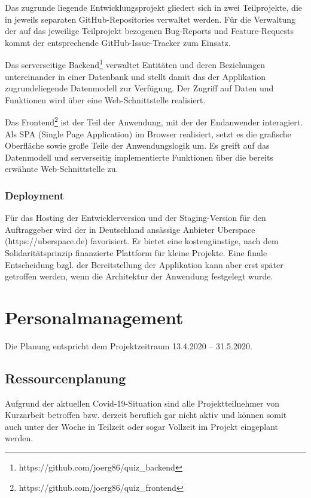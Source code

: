 \documentclass[a4paper,11pt,listof=numbered,glossary=totoc,parskip=half,toc=bib]{scrreprt}
\begin{document}
{\subsection{}

Das zugrunde liegende Entwicklungsprojekt gliedert sich in zwei Teilprojekte, die in jeweils separaten GitHub-Repositories verwaltet werden.
Für die Verwaltung der auf das jeweilige Teilprojekt bezogenen Bug-Reports und Feature-Requests kommt der entsprechende GitHub-Issue-Tracker zum Einsatz.

Das serverseitige Backend\footnote{{https://github.com/joerg86/quiz\_{}backend}} verwaltet Entitäten und deren Beziehungen untereinander in einer Datenbank und stellt damit das der Applikation zugrundeliegende Datenmodell zur Verfügung. 
Der Zugriff auf Daten und Funktionen wird über eine Web-Schnittstelle realisiert.

Das Frontend\footnote{https://github.com/joerg86/quiz\_{}frontend} ist der Teil der Anwendung, mit der der Endanwender interagiert. Als SPA (Single Page Application) im Browser realisiert, setzt es die grafische Oberfläche sowie große Teile der Anwendungslogik um.
Es greift auf das Datenmodell und serverseitig implementierte Funktionen über die bereits erwähnte Web-Schnittstelle zu.

\subsection{Deployment}

Für das Hosting der Entwicklerversion und der Staging-Version für den Auftraggeber wird der in Deutschland ansässige Anbieter Uberspace (https://uberspace.de) favorisiert.
Er bietet eine kostengünstige, nach dem Solidaritätsprinzip finanzierte Plattform für kleine Projekte.
Eine finale Entscheidung bzgl. der Bereitstellung der Applikation kann aber erst später getroffen werden, wenn die Architektur der Anwendung festgelegt wurde.
	\newpage
	\chapter{Personalmanagement}

Die Planung entspricht dem Projektzeitraum 13.4.2020 -- 31.5.2020.

\section{Ressourcenplanung}
Aufgrund der aktuellen Covid-19-Situation sind alle Projektteilnehmer von Kurzarbeit betroffen bzw. derzeit beruflich gar nicht aktiv und können somit auch unter der Woche in Teilzeit oder sogar Vollzeit im Projekt eingeplant werden.

}
\end{document}
